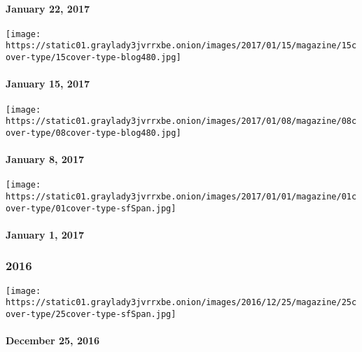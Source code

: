 \hypertarget{january-22-2017}{%
\paragraph{January 22, 2017}\label{january-22-2017}}

\href{http://www.nytimes3xbfgragh.onion/issue/magazine/2017/01/15/magazine-index}{}

\texttt{[image: https://static01.graylady3jvrrxbe.onion/images/2017/01/15/magazine/15cover-type/15cover-type-blog480.jpg]}

\hypertarget{january-15-2017}{%
\paragraph{January 15, 2017}\label{january-15-2017}}

\href{http://www.nytimes3xbfgragh.onion/issue/magazine/2017/01/08/magazine-index-2}{}

\texttt{[image: https://static01.graylady3jvrrxbe.onion/images/2017/01/08/magazine/08cover-type/08cover-type-blog480.jpg]}

\hypertarget{january-8-2017}{%
\paragraph{January 8, 2017}\label{january-8-2017}}

\href{http://www.nytimes3xbfgragh.onion/indexes/2017/01/01/magazine/index.html}{}

\texttt{[image: https://static01.graylady3jvrrxbe.onion/images/2017/01/01/magazine/01cover-type/01cover-type-sfSpan.jpg]}

\hypertarget{january-1-2017}{%
\paragraph{January 1, 2017}\label{january-1-2017}}

\hypertarget{2016}{%
\subsubsection{2016}\label{2016}}

\href{http://www.nytimes3xbfgragh.onion/indexes/2016/12/25/magazine/index.html}{}

\texttt{[image: https://static01.graylady3jvrrxbe.onion/images/2016/12/25/magazine/25cover-type/25cover-type-sfSpan.jpg]}

\hypertarget{december-25-2016}{%
\paragraph{December 25, 2016}\label{december-25-2016}}

